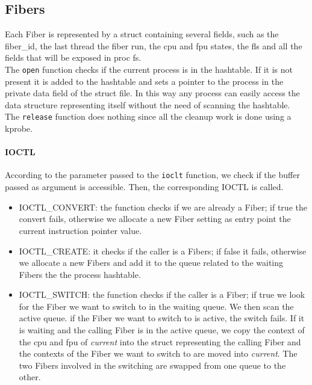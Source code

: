 \documentclass[11pt]{article}
\begin{document}
\subsection{Fibers}
Each Fiber is represented by a struct containing several fields, such as the fiber\_id, the last thread the fiber run, the cpu and fpu states, the fls and all the fields that will be exposed in proc fs.\\
The \texttt{open} function checks if the current process is in the hashtable. If it is not present it is added to the hashtable and sets a pointer to the process in the private data field of the struct file. In this way any process can easily access the data structure representing itself without the need of scanning the hashtable.\\
The \texttt{release} function does nothing since all the cleanup work is done using a kprobe.\\
\paragraph{IOCTL}
According to the parameter passed to the \texttt{ioclt} function, we check if the buffer passed as argument is accessible. Then, the corresponding IOCTL is called.
\begin{itemize}
\item IOCTL\_CONVERT: the function checks if we are already a Fiber; if true the convert fails, otherwise we allocate a new Fiber setting as entry point the current instruction pointer value.
\item IOCTL\_CREATE: it checks if the caller is a Fibers; if false it fails, otherwise we allocate a new Fibers and add it to the queue related to the waiting Fibers the the process hashtable. 
\item IOCTL\_SWITCH: the function checks if the caller is a Fiber; if true we look for the Fiber we want to switch to in the waiting queue. We then scan the active queue. if the Fiber we want to switch to is active, the switch fails. If it is waiting and the calling Fiber is in the active queue, we copy the context of the cpu and fpu of \textit{current} into the struct representing the calling Fiber and the contexts of the Fiber we want to switch to are moved into \textit{current}. The two Fibers involved in the switching are swapped from one queue to the other.
\end{itemize}
\end{document}
